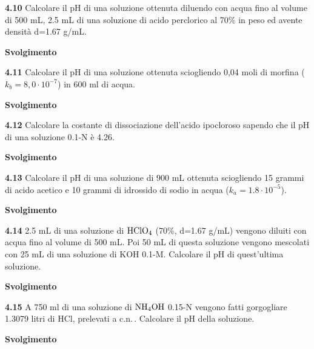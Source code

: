 \vspace{0.2cm}

\vspace{0.2cm}\textbf{4.10} Calcolare il pH di una soluzione ottenuta diluendo con acqua fino al volume di 500 mL, 2.5 mL
di una soluzione di acido perclorico al 70\% in peso ed avente densità d=1.67 g/mL.

\large\textbf{Svolgimento}\normalsize

\vspace{0.2cm}

\vspace{0.2cm}\textbf{4.11} Calcolare il pH di una soluzione ottenuta sciogliendo 0,04 moli di morfina ($k_b = 8,0 \cdot 10^{-7}$) in 600 ml di acqua.

\large\textbf{Svolgimento}\normalsize

\vspace{0.2cm}

\vspace{0.2cm}\textbf{4.12} Calcolare la costante di dissociazione dell’acido ipocloroso sapendo che il pH di una soluzione 0.1-N è 4.26.

\large\textbf{Svolgimento}\normalsize

\vspace{0.2cm}

\vspace{0.2cm}\textbf{4.13} Calcolare il pH di una soluzione di 900 mL ottenuta sciogliendo 15 grammi di acido acetico e 10 grammi di idrossido di sodio in acqua ($k_a = 1.8 \cdot 10^{-5}$).

\large\textbf{Svolgimento}\normalsize

\vspace{0.2cm}

\vspace{0.2cm}\textbf{4.14} 2.5 mL di una soluzione di $\rm HClO_4$ (70\%, d=1.67 g/mL) vengono diluiti con acqua fino al
volume di 500 mL. Poi 50 mL di questa soluzione vengono mescolati con 25 mL di una soluzione di KOH 0.1-M. Calcolare il pH di quest’ultima soluzione.

\large\textbf{Svolgimento}\normalsize

\vspace{0.2cm}

\vspace{0.2cm}\textbf{4.15} A 750 ml di una soluzione di $\rm NH_4OH$ 0.15-N vengono fatti gorgogliare 1.3079 litri di HCl, prelevati a c.n.\,. Calcolare il pH della soluzione.

\large\textbf{Svolgimento}\normalsize

